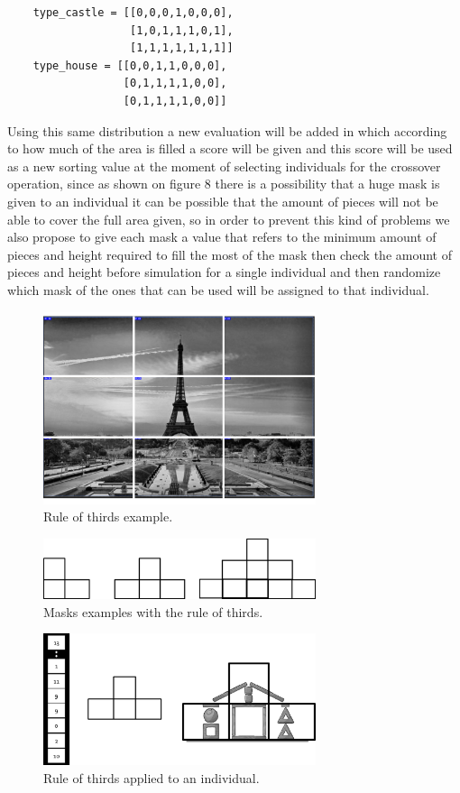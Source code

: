 \documentclass[graybox]{svmult}
\begin{document}
\begin{verbatim}
    type_castle = [[0,0,0,1,0,0,0],
                   [1,0,1,1,1,0,1],
                   [1,1,1,1,1,1,1]]
    type_house = [[0,0,1,1,0,0,0],
                  [0,1,1,1,1,0,0],
                  [0,1,1,1,1,0,0]]
\end{verbatim}

Using this same distribution a new evaluation will be added in which according to how much of the area is filled a score will be given and this score will be used as a new sorting value at the moment of selecting individuals for the crossover operation, since as shown on figure 8 there is a possibility that a huge mask is given to an individual it can be possible that the amount of pieces will not be able to cover the full area given, so in order to prevent this kind of problems we also propose to give each mask a value that refers to the minimum amount of pieces and height required to fill the most of the mask then check the amount of pieces and height before simulation for a single individual and then randomize which mask of the ones that can be used will be assigned to that individual.

\begin{figure}[htbp]
    \centerline{\includegraphics[width=80mm]{Images/ruleofthirds_example.png}}
    \caption{Rule of thirds example.}
    \label{fig}
\end{figure}

\begin{figure}[htbp]
    \centerline{\includegraphics[width=80mm]{Images/mask_distribution.png}}
    \caption{Masks examples with the rule of thirds.}
    \label{fig}
\end{figure}

\begin{figure}[htbp]
    \centerline{\includegraphics[width=80mm]{Images/chromosome_thirds.png}}
    \caption{Rule of thirds applied to an individual.}
    \label{fig}
\end{figure}
\end{document}

